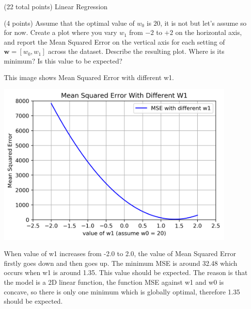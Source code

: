 \documentclass[12pt]{article}
\begin{document}
\begin{question}{(22 total points) Linear Regression}
\begin{subquestion}
\end{subquestion}




%
%
\begin{subquestion}{(4 points) Assume that the optimal value of $w_0$ is $20$, it is not but let's assume so for now. 
Create a plot where you vary $w_1$ from $-2$ to $+2$ on the horizontal axis, and report the Mean Squared Error on the vertical axis for each setting of $\mathbf{w} = [w_0, w_1]$ across the dataset. 
Describe the resulting plot. Where is its minimum? Is this value to be expected?\\ 
}


\begin{answerbox}{35em}
This image shows Mean Squared Error with different w1.
\begin{center}
\includegraphics[width=0.9\textwidth]{MSE_line.png}
\end{center}
When value of w1 increases from -2.0 to 2.0, the value of Mean Squared Error firstly goes down and then goes up. The minimum MSE is around 32.48 which occurs when w1 is around 1.35. This value should be expected. The reason is that the model is a 2D linear function, the function MSE against w1 and w0 is concave, so there is only one minimum which is globally optimal, therefore 1.35 should be expected.
\end{answerbox}



\end{subquestion}


 
\end{question}
\end{document}
